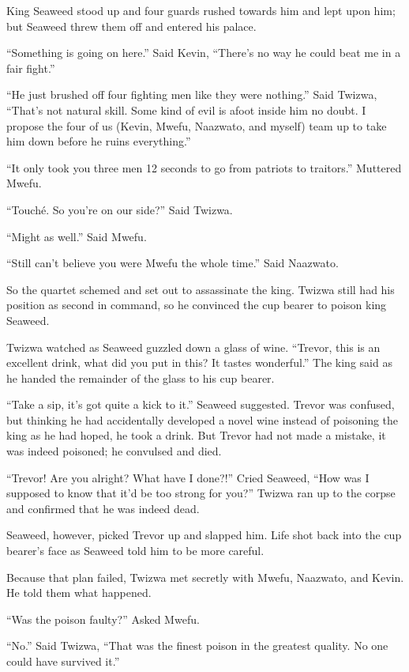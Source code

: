 King Seaweed stood up and four guards rushed towards him and lept upon him; but Seaweed threw them off and entered his palace.

``Something is going on here.'' Said Kevin, ``There's no way he could beat me in a fair fight.''

``He just brushed off four fighting men like they were nothing.'' Said Twizwa, ``That's not natural skill. Some kind of evil is afoot inside him no doubt. I propose the four of us (Kevin, Mwefu, Naazwato, and myself) team up to take him down before he ruins everything.''

``It only took you three men 12 seconds to go from patriots to traitors.'' Muttered Mwefu.

``Touch\'{e}. So you're on our side?'' Said Twizwa.

``Might as well.'' Said Mwefu.

``Still can't believe you were Mwefu the whole time.'' Said Naazwato.

\tbreak

So the quartet schemed and set out to assassinate the king. Twizwa still had his position as second in command, so he convinced the cup bearer to poison king Seaweed.

\tbreak

Twizwa watched as Seaweed guzzled down a glass of wine. ``Trevor, this is an excellent drink, what did you put in this? It tastes wonderful.'' The king said as he handed the remainder of the glass to his cup bearer.

``Take a sip, it's got quite a kick to it.'' Seaweed suggested. Trevor was confused, but thinking he had accidentally developed a novel wine instead of poisoning the king as he had hoped, he took a drink. But Trevor had not made a mistake, it was indeed poisoned; he convulsed and died. 

``Trevor! Are you alright? What have I done?!'' Cried Seaweed, ``How was I supposed to know that it'd be too strong for you?'' Twizwa ran up to the corpse and confirmed that he was indeed dead.

Seaweed, however, picked Trevor up and slapped him. Life shot back into the cup bearer's face as Seaweed told him to be more careful. 

Because that plan failed, Twizwa met secretly with Mwefu, Naazwato, and Kevin. He told them what happened.

``Was the poison faulty?'' Asked Mwefu.

``No.'' Said Twizwa, ``That was the finest poison in the greatest quality. No one could have survived it.'' 


